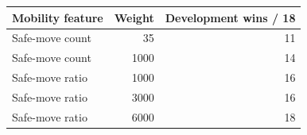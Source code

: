 \begin{tabular}{lrr}
\toprule
Mobility feature & Weight & Development wins / 18 \\
\midrule
Safe-move count & 35 & 11 \\
Safe-move count & 1000 & 14 \\
Safe-move ratio & 1000 & 16 \\
Safe-move ratio & 3000 & 16 \\
Safe-move ratio & 6000 & 18 \\
\bottomrule
\end{tabular}
